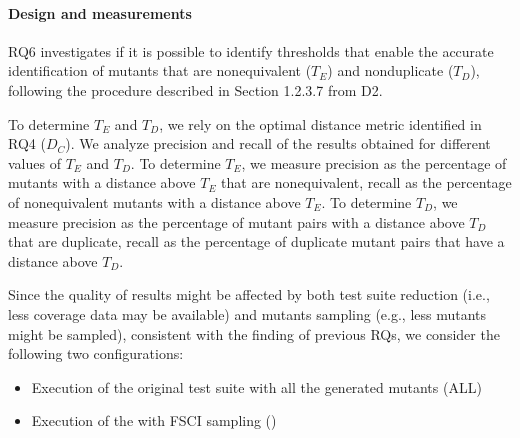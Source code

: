 \paragraph{Design and measurements}
RQ6 investigates if it is possible to identify thresholds that enable the accurate identification of mutants that are nonequivalent ($T_E$) and nonduplicate ($T_D$), following the procedure described in Section 1.2.3.7 from D2.

To determine $T_E$ and $T_D$, 
we rely on the optimal distance metric identified in RQ4 ($D_C$).
We analyze  precision and recall of the results obtained for  different values of $T_E$ and $T_D$.
To determine $T_E$, we measure
precision as the percentage of mutants with a distance above $T_E$ that are nonequivalent, recall as the percentage of nonequivalent mutants with a distance above $T_E$.
To determine $T_D$, we measure
precision as the percentage of mutant pairs with a distance above $T_D$ that are duplicate, recall as the percentage of duplicate mutant pairs that have a distance above $T_D$.

Since the quality of results might be affected by both test suite reduction (i.e., less coverage data may be available) and mutants sampling (e.g., less mutants might be sampled), consistent with the finding of previous RQs, we consider the following two configurations: 
\begin{itemize}
\item Execution of the original test suite with all the generated mutants (ALL)
\item Execution of the \MPTS with FSCI sampling (\APPR)
\end{itemize}


